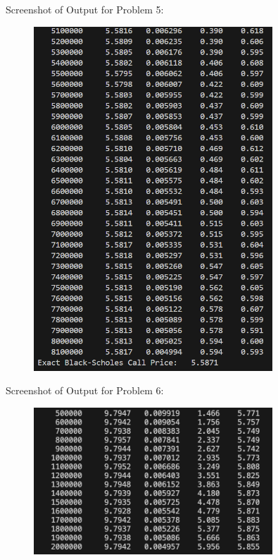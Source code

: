 \documentclass{report}
\begin{document}
\centerline{Screenshot of Output for Problem 5:}
\begin{figure}[H]
    \centering
    \includegraphics[width=0.8\textwidth]{Screenshot_5.png}
\end{figure}

\pagebreak

\centerline{Screenshot of Output for Problem 6:}
\begin{figure}[H]
    \centering
    \includegraphics[width=0.8\textwidth]{Screenshot_6.png}
\end{figure}
\end{document}
